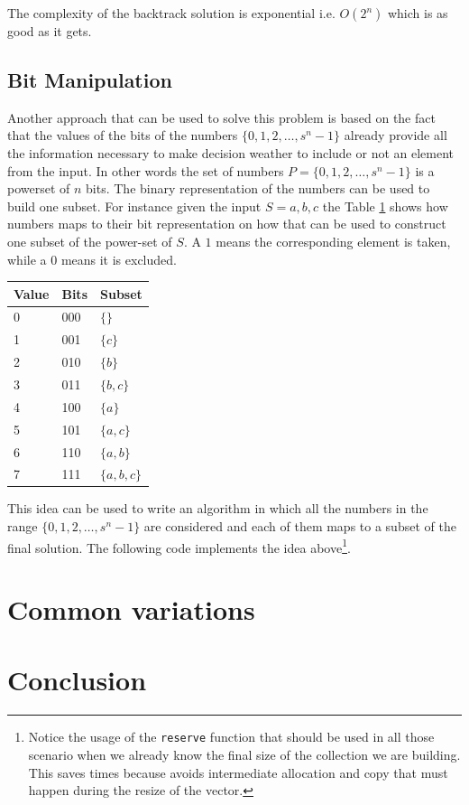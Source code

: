 The complexity of the backtrack solution is exponential i.e. $O(2^n)$ which is as good as it gets.

\subsection{Bit Manipulation}
Another approach that can be used to solve this problem is based on the fact that the values of the bits of the numbers $\{0,1,2,\ldots, s^n-1\}$  already provide all the information necessary to make decision weather to include or not an element from the input. In other words the set of numbers $P=\{0,1,2,\ldots, s^n-1\}$ is a powerset of $n$ bits. The binary representation of the numbers can be used to build one subset. For instance
given the input $S={a,b,c}$ the Table \ref{tab:mapping_value_bits} shows how numbers maps to their bit representation on how that can be used to construct one subset of the power-set of $S$. A $1$ means the corresponding element is taken, while a $0$ means it is excluded.

\begin{table}[H]
	\centering
	\begin{tabular}{|l|l|l|}
		\hline
		Value & Bits & Subset\\ \hline
		0     & 000  & $\{\}$\\ \hline
		1     & 001  & $\{c\}$\\ \hline
		2     & 010  & $\{b\}$\\ \hline
		3     & 011  & $\{b,c\}$\\ \hline
		4     & 100  & $\{a\}$\\ \hline
		5     & 101  & $\{a,c\}$\\ \hline
		6     & 110  & $\{a,b\}$\\ \hline
		7     & 111  & $\{a,b,c\}$\\ \hline
	\end{tabular}
	\label{tab:mapping_value_bits}
\end{table}

This idea can be used to write an algorithm in which all the numbers in the range $\{0,1,2,\ldots, s^n-1\}$ are considered and each of them maps to a subset of the final solution. 
The following code implements the idea above\footnote{Notice the usage of the \texttt{reserve} function that should be used in all those scenario when we already know the final size of the collection we are building. This saves times because avoids intermediate allocation and copy that must happen during the resize of the vector.}.

\begin{minipage}{\linewidth}
	
\end{minipage}

\section{Common variations}

\section{Conclusion}
